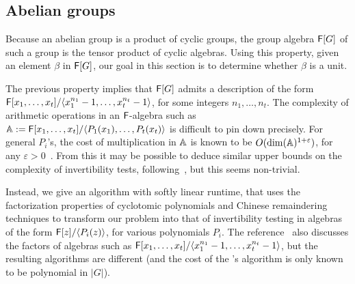 
\subsection{Abelian groups}

Because an abelian group is a product of cyclic groups, the group
algebra ${\mathsf{F}}[G]$ of such a group is the tensor product of cyclic
algebras. Using this property, given an element $\beta$ in ${\mathsf{F}}[G]$,
our goal in this section is to determine whether $\beta$ is a unit.

The previous property implies that ${\mathsf{F}}[G]$ admits a description of the
form ${\mathsf{F}}[x_1,\dots,x_t]/\langle x_1^{n_1}-1,\dots,x_t^{n_t}-1\rangle$,
for some integers $n_1,\dots,n_t$. The complexity of arithmetic
operations in an ${\mathsf{F}}$-algebra such as $\mathbb{A}:={\mathsf{F}}[x_1,\dots,x_t]/\langle
P_1(x_1),\dots,P_t(x_t)\rangle$ is difficult to pin down precisely. For
general $P_i$'s, the cost of multiplication in $\mathbb{A}$ is known to be
$O(\dim(\mathbb{A})^{1+\varepsilon})$, for any $\varepsilon >
0$~\cite[Theorem~2]{LiMoSc09}. From this it may be possible to deduce
similar upper bounds on the complexity of invertibility tests,
following~\cite{DaMMMScXi06}, but this seems non-trivial.

Instead, we give an algorithm with softly linear runtime, that uses
the factorization properties of cyclotomic polynomials and Chinese
remaindering techniques to transform our problem into that of
invertibility testing in algebras of the form ${\mathsf{F}}[z]/\langle P_i(z)
\rangle$, for various polynomials $P_i$. The reference~\cite{Pol94}
also discusses the factors of algebras such as
${\mathsf{F}}[x_1,\dots,x_t]/\langle x_1^{n_1}-1,\dots,x_t^{n_t}-1\rangle$, but
the resulting algorithms are different (and the cost of the
\citeauthor{Pol94}'s \citeyear{Pol94} algorithm is only known to be
polynomial in $|G|$).

\smallskip

